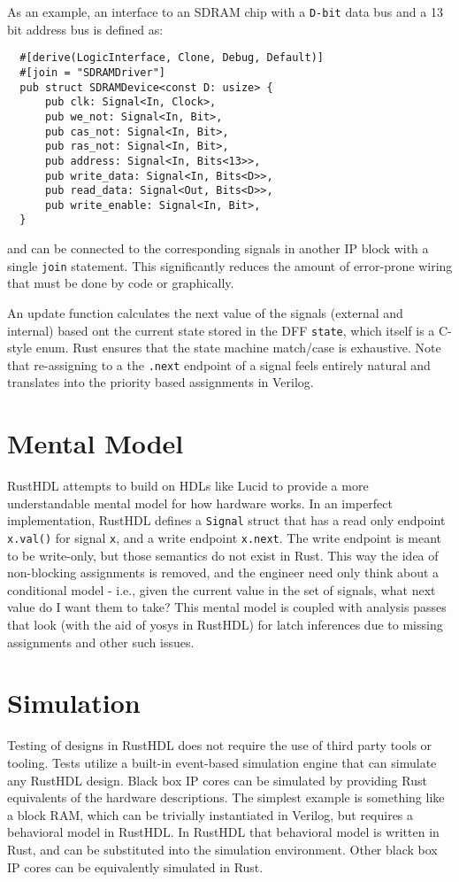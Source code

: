 \documentclass[sigplan,screen,sigconf]{acmart}
\begin{document}
As an example, an interface to an SDRAM chip with a \verb|D-bit| data bus and a 13 bit 
address bus is defined as:

\begin{verbatim}
  #[derive(LogicInterface, Clone, Debug, Default)]
  #[join = "SDRAMDriver"]
  pub struct SDRAMDevice<const D: usize> {
      pub clk: Signal<In, Clock>,
      pub we_not: Signal<In, Bit>,
      pub cas_not: Signal<In, Bit>,
      pub ras_not: Signal<In, Bit>,
      pub address: Signal<In, Bits<13>>,
      pub write_data: Signal<In, Bits<D>>,
      pub read_data: Signal<Out, Bits<D>>,
      pub write_enable: Signal<In, Bit>,
  }
\end{verbatim}

and can be connected to the corresponding signals in another IP block with a single \verb|join|
statement.  This significantly reduces the amount of error-prone wiring that must be done
by code or graphically.

An update function calculates the next value of the signals (external and internal) based
ont the current state stored in the DFF \verb|state|, which itself is a C-style enum.  Rust
ensures that the state machine match/case is exhaustive. 
Note that re-assigning to a the \verb|.next| endpoint of a signal feels entirely 
natural and translates into the priority based assignments in Verilog.

\section{Mental Model}
RustHDL attempts to build on HDLs like Lucid to provide a more understandable mental model for how 
hardware works.  In an imperfect implementation, RustHDL defines a \verb|Signal| struct that has a 
read only endpoint \verb|x.val()| for signal \verb|x|, and a write endpoint \verb|x.next|.  
The write endpoint is meant to be write-only, but those semantics do not exist in Rust.  This way
the idea of non-blocking assignments is removed, and the engineer need only think about a 
conditional model - i.e., given the current value in the set of signals, what next value do I 
want them to take?  This mental model is coupled with analysis passes that look (with the aid 
of yosys in RustHDL) for latch inferences due to missing assignments and other such issues.

\section{Simulation}
Testing of designs in RustHDL does not require the use of third party tools or tooling.  
Tests utilize a built-in event-based simulation engine that can simulate any RustHDL design.
Black box IP cores can be simulated by providing Rust equivalents of the hardware descriptions.
The simplest example is something like a block RAM, which can be trivially instantiated in 
Verilog, but requires a behavioral model in RustHDL.  In RustHDL that behavioral model is 
written in Rust, and can be substituted into the simulation environment.  Other black box
IP cores can be equivalently simulated in Rust.
\end{document}
